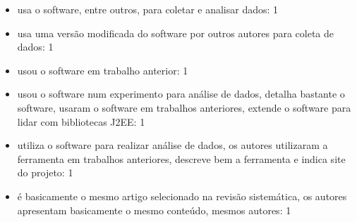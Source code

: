 \begin{itemize}
\item usa o software, entre outros, para coletar e analisar dados: 1
\item usa uma versão modificada do software por outros autores para coleta de dados: 1
\item usou o software em trabalho anterior: 1
\item usou o software num experimento para análise de dados, detalha bastante o software, usaram o software em trabalhos anteriores, extende o software para lidar com bibliotecas J2EE: 1
\item utiliza o software para realizar análise de dados, os autores utilizaram a ferramenta em trabalhos anteriores, descreve bem a ferramenta e indica site do projeto: 1
\item é basicamente o mesmo artigo selecionado na revisão sistemática, os autores apresentam basicamente o mesmo conteúdo, mesmos autores: 1
\end{itemize}

